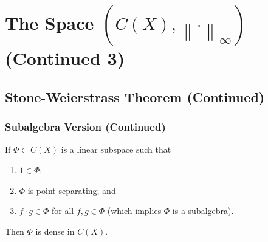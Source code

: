 \documentclass[notoc,notitlepage]{tufte-book}
\newcommand{\norm}[1]{\left\| #1 \right\|}
\begin{document}
\section{The Space $(C(X), \norm\cdot_\infty)$ (Continued 3)}%
\label{sec:the_space_c_x_normcdot_infty_continued_3}

\subsection{Stone-Weierstrass Theorem (Continued)}%
\label{sub:stone_weierstrass_theorem_continued}

\subsubsection{Subalgebra Version (Continued)}%
\label{ssub:subalgebra_version_continued}

\begin{thm}\label{thm:stone_weierstrass_theorem_subalgebra_version}
  If $\Phi \subset C(X)$ is a linear subspace such that
  \begin{enumerate}
    \item $1 \in \Phi$;
    \item $\Phi$ is point-separating; and
    \item $f \cdot g \in \Phi$ for all $f, g \in \Phi$ (which implies $\Phi$ is a subalgebra).
  \end{enumerate}
  Then $\bar{\Phi}$ is dense in $C(X)$.
\end{thm}
\end{document}
